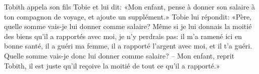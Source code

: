 Tobith appela son fils Tobie et lui dit:
	«Mon enfant, pense à donner son salaire à ton compagnon de voyage,
	et ajoute un supplément.»
Tobie lui répondit:
	«Père, quelle somme vais-je lui donner comme salaire?
	Même si je lui donnais la moitié des biens qu’il a rapportés avec moi,
	je n’y perdrais pas:
	il m’a ramené ici en bonne santé, il a guéri ma femme,
	il a rapporté l’argent avec moi, et il t’a guéri.
Quelle somme vais-je donc lui donner comme salaire?
– Mon enfant, reprit Tobith,
	il est juste qu’il reçoive la moitié de tout ce qu’il a rapporté.»
